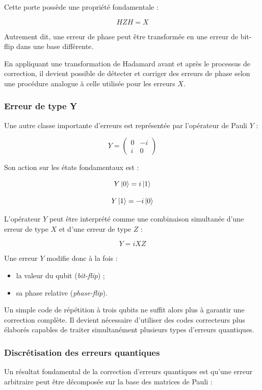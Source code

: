 \documentclass[a4paper,12pt]{article}
\begin{document}
Cette porte possède une propriété fondamentale :

\[
HZH=X
\]

Autrement dit, une erreur de phase peut être transformée en une erreur de bit-flip dans une base différente.

En appliquant une transformation de Hadamard avant et après le processus de correction, il devient possible de détecter et corriger des erreurs de phase selon une procédure analogue à celle utilisée pour les erreurs $X$.

\subsubsection{Erreur de type Y}

Une autre classe importante d’erreurs est représentée par l’opérateur de Pauli $Y$ :

\[
Y=
\begin{pmatrix}
0&-i\\
i&0
\end{pmatrix}
\]

Son action sur les états fondamentaux est :

\[
Y\ket{0}
=
i\ket{1}
\]

\[
Y\ket{1}
=
-i\ket{0}
\]

L’opérateur $Y$ peut être interprété comme une combinaison simultanée d’une erreur de type $X$ et d’une erreur de type $Z$ :

\[
Y=iXZ
\]

Une erreur $Y$ modifie donc à la fois :

\begin{itemize}
    \item la valeur du qubit (\textit{bit-flip}) ;
    \item sa phase relative (\textit{phase-flip}).
\end{itemize}

Un simple code de répétition à trois qubits ne suffit alors plus à garantir une correction complète. Il devient nécessaire d’utiliser des codes correcteurs plus élaborés capables de traiter simultanément plusieurs types d’erreurs quantiques.

\subsubsection{Discrétisation des erreurs quantiques}

Un résultat fondamental de la correction d’erreurs quantiques est qu’une erreur arbitraire peut être décomposée sur la base des matrices de Pauli :
\end{document}
